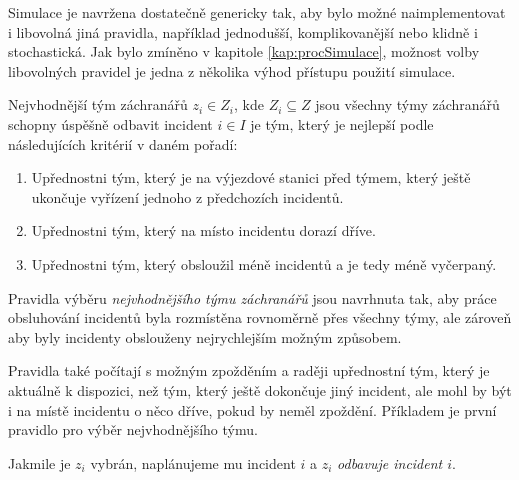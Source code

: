 Simulace je navržena dostatečně genericky tak, aby bylo možné naimplementovat i libovolná jiná pravidla, například jednodušší, komplikovanější nebo klidně i stochastická.
Jak bylo zmíněno v kapitole \ref{kap:procSimulace}, možnost volby libovolných pravidel je jedna z několika výhod přístupu použití simulace.
\begin{definice}\label{df:simulacePravidla2}
  Nejvhodnější tým záchranářů $z_i \in Z_i$, kde $Z_i \subseteq Z$ jsou všechny týmy záchranářů schopny úspěšně odbavit incident $i \in I$ je tým,
  který je nejlepší podle následujících kritérií v daném pořadí:
  \begin{enumerate}
    \item Upřednostni tým, který je na výjezdové stanici před týmem, který ještě ukončuje vyřízení jednoho z předchozích incidentů. 
    \item Upřednostni tým, který na místo incidentu dorazí dříve. 
    \item Upřednostni tým, který obsloužil méně incidentů a je tedy méně vyčerpaný.
  \end{enumerate}
\end{definice}
Pravidla výběru \textit{nejvhodnějšího týmu záchranářů} jsou navrhnuta tak,
aby práce obsluhování incidentů byla rozmístěna rovnoměrně přes všechny týmy, ale zároveň aby byly incidenty obslouženy nejrychlejším možným způsobem.

Pravidla také počítají s možným zpožděním a raději upřednostní tým, který je aktuálně k dispozici, než tým, který ještě dokončuje jiný incident,
ale mohl by být i na místě incidentu o něco dříve, pokud by neměl zpoždění. Příkladem je první pravidlo pro výběr nejvhodnějšího týmu.

Jakmile je $z_i$ vybrán, naplánujeme mu incident $i$ a $z_i$ \textit{odbavuje incident $i$}.

\clearpage

